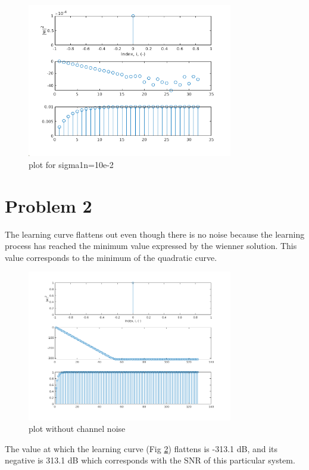 \documentclass[12pt,letterpaper]{article}
\begin{document}
\begin{figure}[!h] 
    \centering
    \includegraphics[width=0.8\textwidth]{../matlab/img/e-2.png}
    \caption{plot for sigma1n=10e-2}
    \label{fig:simu2}
\end{figure}
    

\section{Problem 2}
The learning curve flattens out even though there is no noise because the learning process has reached the minimum
value expressed by the wienner solution. This value corresponds to the minimum of the quadratic curve.

\begin{figure}[!h] 
  \centering
  \includegraphics[width=0.8\textwidth]{../matlab/img/flat.png}
  \caption{plot without channel noise}
  \label{fig:flat}
\end{figure}

The value at which the learning curve (Fig \ref{fig:flat}) flattens is -313.1 dB, and its negative is 313.1 dB which corresponds with 
the SNR of this particular system.
\end{document}
